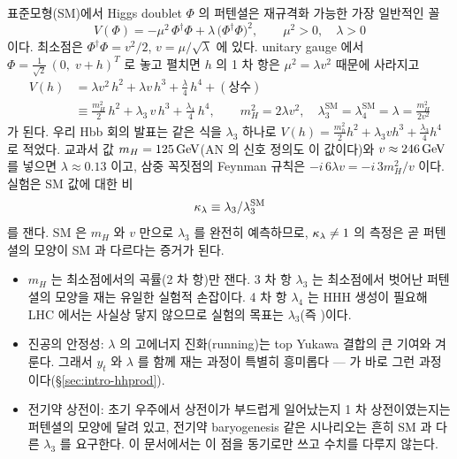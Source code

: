 표준모형(SM)에서 Higgs doublet $\Phi$ 의 퍼텐셜은 재규격화 가능한 가장 일반적인 꼴
\begin{equation}
  V(\Phi) = -\mu^{2}\,\Phi^{\dagger}\Phi + \lambda\,\bigl(\Phi^{\dagger}\Phi\bigr)^{2},
  \qquad \mu^{2}>0,\quad \lambda>0
  \label{eq:intro-vphi}
\end{equation}
이다. 최소점은 $\Phi^{\dagger}\Phi = v^{2}/2$, $v=\mu/\sqrt{\lambda}$ 에 있다. unitary gauge 에서 $\Phi = \tfrac{1}{\sqrt{2}}\,(0,\; v+h)^{T}$ 로 놓고
펼치면 $h$ 의 1 차 항은 $\mu^{2}=\lambda v^{2}$ 때문에 사라지고
\begin{align}
  V(h) &= \lambda v^{2}\,h^{2} + \lambda v\,h^{3} + \frac{\lambda}{4}\,h^{4} + (\text{상수}) \nonumber\\
       &\equiv \frac{m_{H}^{2}}{2}\,h^{2} + \lambda_{3}\,v\,h^{3} + \frac{\lambda_{4}}{4}\,h^{4},
  \qquad
  m_{H}^{2} = 2\lambda v^{2},\quad
  \lambda_{3}^{\mathrm{SM}} = \lambda_{4}^{\mathrm{SM}} = \lambda = \frac{m_{H}^{2}}{2v^{2}}
  \label{eq:intro-vh}
\end{align}
가 된다. 우리 Hbb 회의 발표는 같은 식을 $\lambda_3$ 하나로 $V(h)=\tfrac{m_h^2}{2}h^2+\lambda_3 v h^3+\tfrac{\lambda_3}{4}h^4$ 로 적었다.
교과서 값 $m_H=125\,\mathrm{GeV}$(AN 의 신호 정의도 이 값이다)와 $v\approx 246\,\mathrm{GeV}$ 를 넣으면 $\lambda\approx 0.13$ 이고,
삼중 꼭짓점의 Feynman 규칙은 $-i\,6\lambda v = -i\,3m_H^{2}/v$ 이다. 실험은 SM 값에 대한 비
\begin{equation}
  \kappa_{\lambda} \equiv \lambda_{3}/\lambda_{3}^{\mathrm{SM}}
  \label{eq:intro-kl}
\end{equation}
를 잰다. SM 은 $m_H$ 와 $v$ 만으로 $\lambda_3$ 를 완전히 예측하므로, $\kappa_{\lambda}\neq1$ 의 측정은 곧 퍼텐셜의 모양이 SM 과 다르다는 증거가 된다.

\begin{note}[왜 자기 결합인가]
\begin{itemize}
  \item $m_H$ 는 최소점에서의 곡률(2 차 항)만 잰다. 3 차 항 $\lambda_3$ 는 최소점에서 벗어난 퍼텐셜의 모양을 재는 유일한 실험적 손잡이다.
        4 차 항 $\lambda_4$ 는 HHH 생성이 필요해 LHC 에서는 사실상 닿지 않으므로 실험의 목표는 $\lambda_3$(즉 \kl)이다.
  \item 진공의 안정성: $\lambda$ 의 고에너지 진화(running)는 top Yukawa 결합의 큰 기여와 겨룬다. 그래서 $y_t$ 와 $\lambda$ 를 함께 재는 과정이 특별히
        흥미롭다 — \ttHH 가 바로 그런 과정이다(\S\ref{sec:intro-hhprod}).
  \item 전기약 상전이: 초기 우주에서 상전이가 부드럽게 일어났는지 1 차 상전이였는지는 퍼텐셜의 모양에 달려 있고, 전기약 baryogenesis 같은 시나리오는
        흔히 SM 과 다른 $\lambda_3$ 를 요구한다. 이 문서에서는 이 점을 동기로만 쓰고 수치를 다루지 않는다.
\end{itemize}
\end{note}

